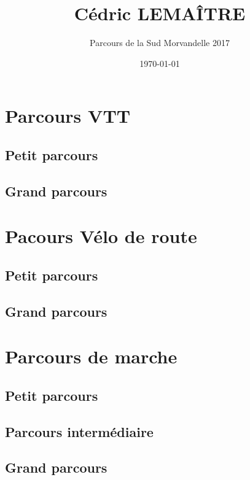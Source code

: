 \documentclass[12pt]{article}
\title{Cédric LEMAÎTRE}
\author{Parcours de la Sud Morvandelle 2017}
\date\today
\begin{document}
\maketitle



\section{Parcours VTT}

\subsection{Petit parcours}


\subsection{Grand parcours}



\section{Pacours Vélo de route}

\subsection{Petit parcours}


\subsection{Grand parcours}



\section{Parcours de marche}

\subsection{Petit parcours}


\subsection{Parcours intermédiaire}


\subsection{Grand parcours}

\end{document}
